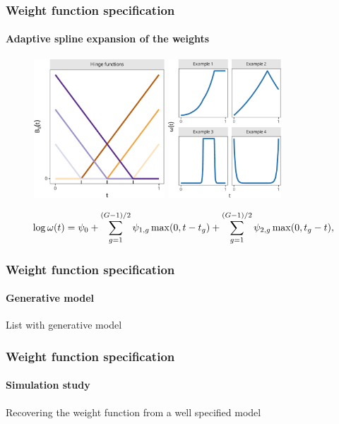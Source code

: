 \documentclass{snedecorbeamer}
\begin{document}
\begin{frame}
  \frametitle{Weight function specification}
  \framesubtitle{Adaptive spline expansion of the weights}

  \begin{figure}
    \centering
    \includegraphics[height=14em]{inc/bew_hinge_basis_fsc070.pdf}
    \includegraphics[height=14em]{inc/bew_hinge_weights_fsc070.pdf}
  \end{figure}
  \begin{equation}
    \tiny
    \log\omega(t)
    \label{eq:hew-log}
    =\psi_{0} + \sum_{g=1}^{(G-1)/2} \psi_{1,g}\max(0, t - t_g)
    + \sum_{g=1}^{(G-1)/2} \psi_{2,g}\max(0, t_g - t),
  \end{equation}

\end{frame}

\begin{frame}
  \frametitle{Weight function specification}
  \framesubtitle{Generative model}

  List with generative model
\end{frame}

\begin{frame}
  \frametitle{Weight function specification}
  \framesubtitle{Simulation study}

  Recovering the weight function from a well specified model
\end{frame}
\end{document}

